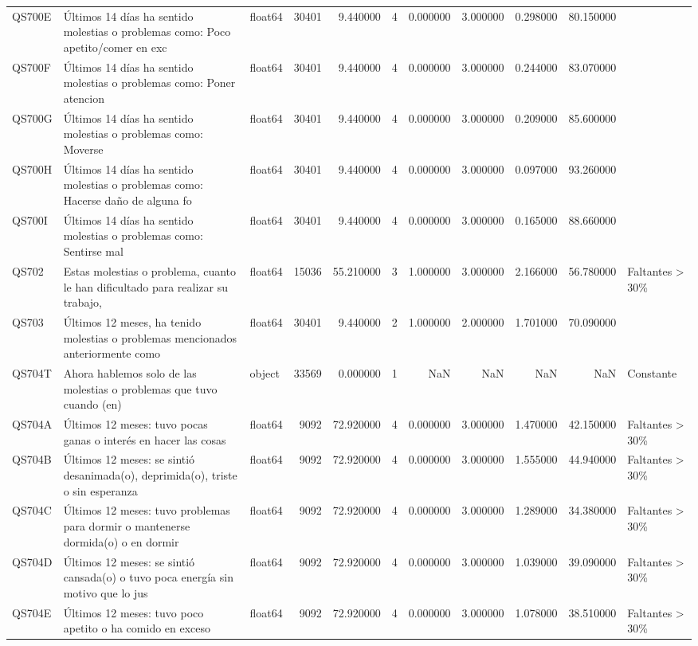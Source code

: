 \begin{longtable}{lllrrrrrrrl}
QS700E & Últimos 14 días ha sentido molestias o problemas como: Poco apetito/comer en exc & float64 & 30401 & 9.440000 & 4 & 0.000000 & 3.000000 & 0.298000 & 80.150000 &  \\
QS700F & Últimos 14 días ha sentido molestias o problemas como: Poner atencion & float64 & 30401 & 9.440000 & 4 & 0.000000 & 3.000000 & 0.244000 & 83.070000 &  \\
QS700G & Últimos 14 días ha sentido molestias o problemas como: Moverse & float64 & 30401 & 9.440000 & 4 & 0.000000 & 3.000000 & 0.209000 & 85.600000 &  \\
QS700H & Últimos 14 días ha sentido molestias o problemas como: Hacerse daño de alguna fo & float64 & 30401 & 9.440000 & 4 & 0.000000 & 3.000000 & 0.097000 & 93.260000 &  \\
QS700I & Últimos 14 días ha sentido molestias o problemas como: Sentirse mal & float64 & 30401 & 9.440000 & 4 & 0.000000 & 3.000000 & 0.165000 & 88.660000 &  \\
QS702 & Estas molestias o problema, cuanto le han dificultado para realizar su trabajo,  & float64 & 15036 & 55.210000 & 3 & 1.000000 & 3.000000 & 2.166000 & 56.780000 & Faltantes > 30\% \\
QS703 & Últimos 12 meses, ha tenido molestias o problemas mencionados anteriormente como & float64 & 30401 & 9.440000 & 2 & 1.000000 & 2.000000 & 1.701000 & 70.090000 &  \\
QS704T & Ahora hablemos solo de las molestias o problemas que tuvo cuando (en) & object & 33569 & 0.000000 & 1 & NaN & NaN & NaN & NaN & Constante \\
QS704A & Últimos 12 meses: tuvo pocas ganas o interés en hacer las cosas & float64 & 9092 & 72.920000 & 4 & 0.000000 & 3.000000 & 1.470000 & 42.150000 & Faltantes > 30\% \\
QS704B & Últimos 12 meses: se sintió desanimada(o), deprimida(o), triste o sin esperanza & float64 & 9092 & 72.920000 & 4 & 0.000000 & 3.000000 & 1.555000 & 44.940000 & Faltantes > 30\% \\
QS704C & Últimos 12 meses: tuvo problemas para dormir o mantenerse dormida(o) o en dormir & float64 & 9092 & 72.920000 & 4 & 0.000000 & 3.000000 & 1.289000 & 34.380000 & Faltantes > 30\% \\
QS704D & Últimos 12 meses: se sintió cansada(o) o tuvo poca energía sin motivo que lo jus & float64 & 9092 & 72.920000 & 4 & 0.000000 & 3.000000 & 1.039000 & 39.090000 & Faltantes > 30\% \\
QS704E & Últimos 12 meses: tuvo poco apetito o ha comido en exceso & float64 & 9092 & 72.920000 & 4 & 0.000000 & 3.000000 & 1.078000 & 38.510000 & Faltantes > 30\% \\

\end{longtable}
